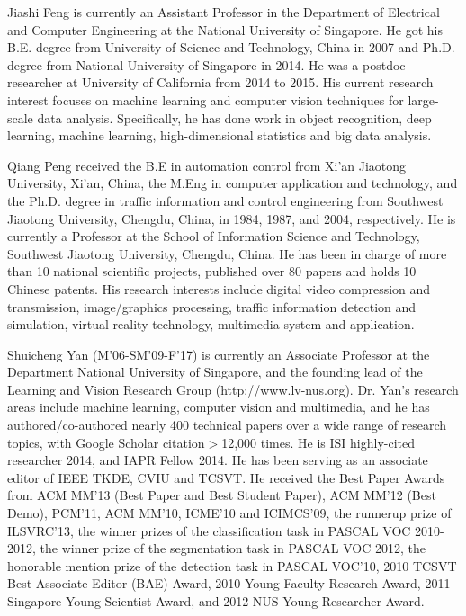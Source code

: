 \documentclass[journal]{IEEEtran}
\begin{document}
\begin{IEEEbiography}{Jiashi Feng} is currently an Assistant Professor in the Department of Electrical and Computer Engineering at the National University of Singapore. He got his B.E. degree from University of Science and Technology, China in 2007 and Ph.D. degree from National University of Singapore in 2014. He was a postdoc researcher at University of California from 2014 to 2015. His current research interest focuses on machine learning and computer vision techniques for large-scale data analysis. Specifically, he has done work in object recognition, deep learning, machine learning, high-dimensional statistics and big data analysis.
\end{IEEEbiography}

\begin{IEEEbiography}{Qiang Peng}
	received the B.E in automation control from Xi'an Jiaotong University, Xi'an, China, the M.Eng in computer application and technology, and the Ph.D. degree in traffic information and control engineering from Southwest Jiaotong University, Chengdu, China, in 1984, 1987, and 2004, respectively. He is currently a Professor at the School of Information Science and Technology, Southwest Jiaotong University, Chengdu, China. He has been in charge of more than 10 national scientific projects, published over 80 papers and holds 10 Chinese patents. His research interests include digital video compression and transmission, image/graphics processing, traffic information detection and simulation, virtual reality technology, multimedia system and application.
\end{IEEEbiography}

\begin{IEEEbiography}{Shuicheng Yan}
	(M'06-SM'09-F'17) is currently an Associate Professor at the Department National University of Singapore, and the founding lead of the Learning and Vision Research Group (http://www.lv-nus.org). Dr. Yan's research areas include machine learning, computer vision and multimedia, and he has authored/co-authored nearly 400 technical papers over a wide range of research topics, with Google Scholar citation$>$12,000 times. He is ISI highly-cited researcher 2014, and IAPR Fellow 2014. He has been serving as an associate editor of IEEE TKDE, CVIU and TCSVT. He received the Best Paper Awards from ACM MM'13 (Best Paper and Best Student Paper), ACM MM'12 (Best Demo), PCM'11, ACM MM'10, ICME'10 and ICIMCS'09, the runnerup prize of ILSVRC'13, the winner prizes of the classification task in PASCAL VOC 2010-2012, the winner prize of the segmentation task in PASCAL VOC 2012, the honorable mention prize of the detection task in PASCAL VOC'10, 2010 TCSVT Best Associate Editor (BAE) Award, 2010 Young Faculty Research Award, 2011 Singapore Young Scientist Award, and 2012 NUS Young Researcher Award.
\end{IEEEbiography}
\end{document}
